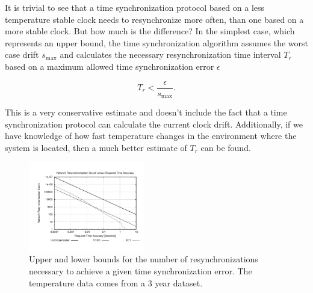It is trivial to see that a time synchronization protocol based on a less
temperature stable clock needs to resynchronize more often, than one based on
a more stable clock. But how much is the difference? In the simplest case,
which represents an upper bound, the time synchronization algorithm assumes
the worst case drift $s_{\max}$ and calculates the necessary resynchronization
time interval $T_r$ based on a maximum allowed time synchronization error
$\epsilon$

\begin{equation}
    T_r < \frac{\epsilon}{s_{\max}}.
\end{equation}

This is a very conservative estimate and doesn't include the fact that a time
synchronization protocol can calculate the current clock drift. Additionally,
if we have knowledge of how fast temperature changes in the environment where
the system is located, then a much better estimate of $T_r$ can be found. 

\begin{figure}
    \begin{center}
        \includegraphics[angle=-90,width=0.45\textwidth]{figures/mosscamresync}
        \caption{Upper and lower bounds for the number of resynchronizations
        necessary to achieve a given time synchronization error. The
        temperature data comes from a 3 year dataset.}
        \label{fig:resync}
    \end{center}
\end{figure}


